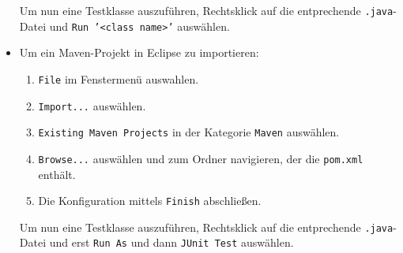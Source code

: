 \documentclass[german]{acAssignment}
\begin{document}
\begin{itemize}
        Um nun eine Testklasse auszuführen, Rechtsklick auf die entprechende \texttt{.java}-Datei und \texttt{Run '<class name>'} auswählen.
    
    \item Um ein Maven-Projekt in Eclipse zu importieren:
    
        \begin{enumerate}
            \item \texttt{File} im Fenstermenü auswahlen.
            \item \texttt{Import...} auswählen.
            \item \texttt{Existing Maven Projects} in der Kategorie \texttt{Maven} auswählen.
            \item \texttt{Browse...} auswählen und zum Ordner navigieren, der die \texttt{pom.xml} enthält.
            \item Die Konfiguration mittels \texttt{Finish} abschließen.
        \end{enumerate}
        
        Um nun eine Testklasse auszuführen, Rechtsklick auf die entprechende \texttt{.java}-Datei und erst \texttt{Run As} und dann \texttt{JUnit Test} auswählen.
\end{itemize}
\end{document}

